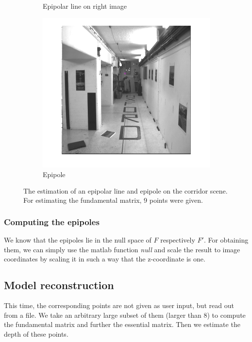 \documentclass{paper}
\begin{document}
\begin{figure}
\begin{subfigure}{0.49\textwidth}
   \caption{Epipolar line on right image}
\end{subfigure}
\begin{subfigure}{0.49\textwidth}
   \includegraphics[width=\textwidth]{corridor_epipole}
   \caption{Epipole}
\end{subfigure}
\caption{The estimation of an epipolar line and epipole 
on the corridor scene. For estimating the fundamental matrix, 9 points were given.}
\label{fig:corridor}
\end{figure}

\subsubsection{Computing the epipoles}
We know that the epipoles lie in the null space of $F$ respectively $F'$. For
obtaining them, we can simply use the matlab function \emph{null} and scale 
the result to image coordinates by scaling it in such a way that 
the z-coordinate is one.
 
\subsection{Model reconstruction}
This time, the corresponding points are not given as user input, but
read out from a file. We take an arbitrary large subset of them 
(larger than 8) to compute the fundamental
matrix and further the essential matrix. Then we estimate the depth of these points.
\end{document}
